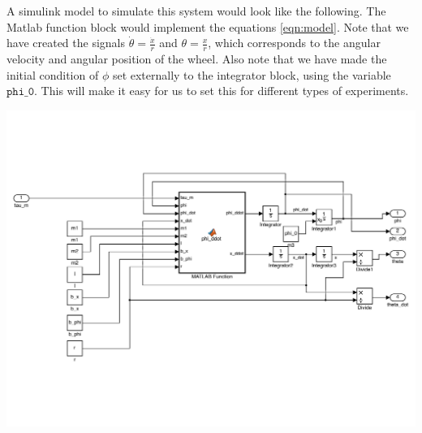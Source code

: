 A simulink model to simulate this system would look like the following. The Matlab function block would implement the equations \eqref{eqn:model}. Note that we have created the signals $\dot{\theta} = \frac{\dot{x}}{r}$ and $\theta = \frac{x}{r}$, which corresponds to the angular velocity and angular position of the wheel. Also note that we have made the initial condition of $\phi$ set externally to the integrator block, using the variable $\texttt{phi\_0}$. This will make it easy for us to set this for different types of experiments.

\begin{center}
\includegraphics[width=6in]{figures/pendulum_robot}
\end{center}


